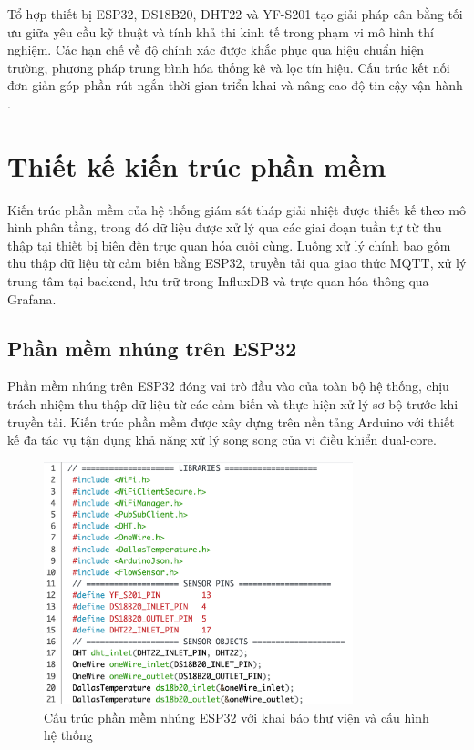 \documentclass[../main.tex]{subfiles}
\begin{document}
Tổ hợp thiết bị ESP32, DS18B20, DHT22 và YF-S201 tạo giải pháp cân bằng tối ưu giữa yêu cầu kỹ thuật và tính khả thi kinh tế trong phạm vi mô hình thí nghiệm. Các hạn chế về độ chính xác được khắc phục qua hiệu chuẩn hiện trường, phương pháp trung bình hóa thống kê và lọc tín hiệu. Cấu trúc kết nối đơn giản góp phần rút ngắn thời gian triển khai và nâng cao độ tin cậy vận hành \cite{Espressif_ESP32_technical_reference,datasheet_DS18B20,datasheet_DHT22,datasheet_YFS201,ashrae2020cooling,epa_watersense_cooling_towers_2012}.

\section{Thiết kế kiến trúc phần mềm}
\label{sec:software_design}

Kiến trúc phần mềm của hệ thống giám sát tháp giải nhiệt được thiết kế theo mô hình phân tầng, trong đó dữ liệu được xử lý qua các giai đoạn tuần tự từ thu thập tại thiết bị biên đến trực quan hóa cuối cùng. Luồng xử lý chính bao gồm thu thập dữ liệu từ cảm biến bằng ESP32, truyền tải qua giao thức MQTT, xử lý trung tâm tại backend, lưu trữ trong InfluxDB và trực quan hóa thông qua Grafana.

\subsection{Phần mềm nhúng trên ESP32}
\label{sec:esp32_software}

Phần mềm nhúng trên ESP32 đóng vai trò đầu vào của toàn bộ hệ thống, chịu trách nhiệm thu thập dữ liệu từ các cảm biến và thực hiện xử lý sơ bộ trước khi truyền tải. Kiến trúc phần mềm được xây dựng trên nền tảng Arduino với thiết kế đa tác vụ tận dụng khả năng xử lý song song của vi điều khiển dual-core.

\begin{figure}
    \centering
    \includegraphics[width=0.8\textwidth]{../Hinhve/nhung_esp.png}
    \caption{Cấu trúc phần mềm nhúng ESP32 với khai báo thư viện và cấu hình hệ thống}
    \label{fig:esp32_firmware}
\end{figure}
\end{document}

